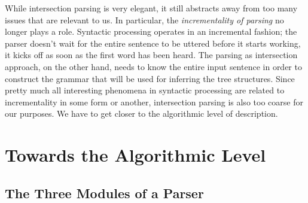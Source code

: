 While intersection parsing is very elegant, it still abstracts away from too many issues that are relevant to us.
In particular, the \emph{incrementality of parsing} no longer plays a role.
Syntactic processing operates in an incremental fashion;
the parser doesn't wait for the entire sentence to be uttered before it starts working, it kicks off as soon as the first word has been heard.
The parsing as intersection approach, on the other hand, needs to know the entire input sentence in order to construct the grammar that will be used for inferring the tree structures.
Since pretty much all interesting phenomena in syntactic processing are related to incrementality in some form or another, intersection parsing is also too coarse for our purposes.
We have to get closer to the algorithmic level of description.


\section{Towards the Algorithmic Level}
\label{sec:ParserOverview_AlgorithmicLevel}

\subsection{The Three Modules of a Parser}
\label{sub:ParserOverview_Modules}


